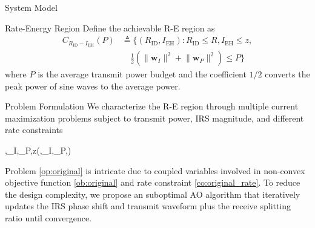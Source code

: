 \documentclass[journal]{IEEEtran}
\begin{document}
\begin{section}{System Model}
		\begin{subsection}{Rate-Energy Region}
			Define the achievable R-E region as
			\begin{align}
				C_{R_{\text{ID}}-I_{\text{EH}}}(P)
				&\triangleq \biggl\{(R_{\text{ID}}, I_{\text{EH}}): R_{\text{ID}} \le R, I_{\text{EH}} \le z,\nonumber\\
				&\quad \frac{1}{2}\left(\lVert{\boldsymbol{w}_I}\rVert^2+\lVert{\boldsymbol{w}_P}\rVert^2\right) \le P\biggr\}
			\end{align}
			where $P$ is the average transmit power budget and the coefficient $1/2$ converts the peak power of sine waves to the average power.
		\end{subsection}
	\end{section}


	\begin{section}{Problem Formulation}\label{se:problem_formulation}
		We characterize the R-E region through multiple current maximization problems subject to transmit power, IRS magnitude, and different rate constraints
		\begin{maxi!}
			{\boldsymbol{\phi},\boldsymbol{w}_I,_P,\rho}{z(\boldsymbol{\phi},\boldsymbol{w}_I,_P,\rho)}{\label{op:original}}{\label{ob:original}}
			\label{co:original_power}
			\label{co:original_rate}
			\label{co:original_modulus}
		\end{maxi!}
		Problem \ref{op:original} is intricate due to coupled variables involved in non-convex objective function \ref{ob:original} and rate constraint \ref{co:original_rate}. To reduce the design complexity, we propose an suboptimal AO algorithm that iteratively updates the IRS phase shift and transmit waveform plus the receive splitting ratio until convergence.



\end{section}
\end{document}
